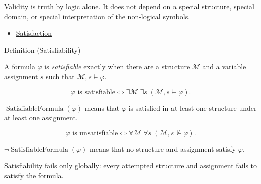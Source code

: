\begin{remark*}[Interpretation]
Validity is truth by logic alone. It does not depend on a special structure,
special domain, or special interpretation of the non-logical symbols.
\end{remark*}

\begin{dependencies}
\begin{itemize}
  \item \hyperref[def:fol-satisfaction]{Satisfaction}
\end{itemize}
\end{dependencies}

\begin{definitionbox}{Definition (Satisfiability)}
\begin{definition}[Satisfiability]
\label{def:fol-satisfiability}
A formula \(\varphi\) is \emph{satisfiable} exactly when there are a structure
\(\mathcal M\) and a variable assignment \(s\) such that
\(\mathcal M,s\models\varphi\).
\end{definition}
\end{definitionbox}

\begin{remark*}
\[
\varphi \text{ is satisfiable}
\Longleftrightarrow
\exists \mathcal M\;\exists s\;(\mathcal M,s\models\varphi).
\]
\end{remark*}

\begin{remark*}
\(\operatorname{SatisfiableFormula}(\varphi)\) means that \(\varphi\) is
satisfied in at least one structure under at least one assignment.
\end{remark*}

\begin{remark*}
\[
\varphi \text{ is unsatisfiable}
\Longleftrightarrow
\forall \mathcal M\;\forall s\;(\mathcal M,s\not\models\varphi).
\]
\end{remark*}

\begin{remark*}
\(\neg\operatorname{SatisfiableFormula}(\varphi)\) means that no structure and
assignment satisfy \(\varphi\).
\end{remark*}

\begin{remark*}
Satisfiability fails only globally: every attempted structure and assignment
fails to satisfy the formula.
\end{remark*}

